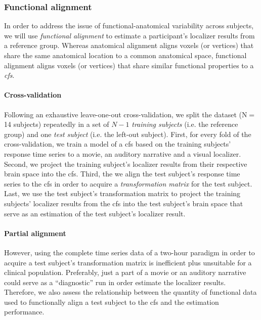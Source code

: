 \subsubsection{Functional alignment}


In order to address the issue of functional-anatomical variability across
subjects, we will use \textit{functional alignment} \citep[cf.][for
reviews]{haxby2020hyperalignment, bazeille2021empirical} to estimate a
participant's localizer results from a reference group.
%
Whereas anatomical alignment aligns voxels (or vertices) that share the same
anatomical location to a common anatomical space, functional alignment aligns
voxels (or vertices) that share similar functional properties to a
\textit{\ac{cfs}}.


\paragraph{Cross-validation}



%
Following an exhaustive leave-one-out cross-validation, we split the dataset
(N$=$14 subjects) repeatedly in a set of $N-1$ \textit{training subjects} (i.e.
the reference group) and one \textit{test subject} (i.e. the left-out subject).
%
First, for every fold of the cross-validation, we train a model of a \ac{cfs}
based on the training subjects' response time series to a movie, an auditory
narrative and a visual localizer.
%
Second, we project the training subject's localizer results from their
respective brain space into the \ac{cfs}.
%
Third, the we align the test subject's response time series to the \ac{cfs} in
order to acquire a \textit{transformation matrix} for the test subject.
%
Last, we use the test subject's transformation matrix to project the training
subjects' localizer results from the \ac{cfs} into the test subject's brain
space that serve as an estimation of the test subject's localizer result.

\paragraph{Partial alignment}
However, using the complete time series data of a two-hour paradigm in order to
acquire a test subject's transformation matrix is inefficient plus unsuitable
for a clinical population.
%
Preferably, just a part of a movie or an auditory narrative could serve as a
``diagnostic'' run in order estimate the localizer results.
%
Therefore, we also assess the relationship between the quantity of functional
data used to functionally align a test subject to the \ac{cfs} and the
estimation performance.


